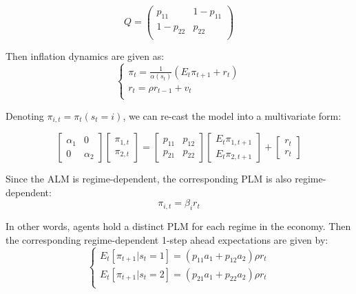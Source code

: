 \documentclass[12pt,reqno]{article}
\numberwithin{equation}{section}
\begin{document}
$$
Q=\begin{pmatrix}
p_{11} & 1-p_{11} \\
1-p_{22} & p_{22} \\
\end{pmatrix}
$$

Then inflation dynamics are given as: \\

$$
\begin{cases}
\pi_t = \frac{1}{\alpha(s_t)}(E_t \pi_{t+1} + r_t) \\
r_t = \rho r_{t-1} + v_t \\
\end{cases}
$$

Denoting $\pi_{i,t} = \pi_t (s_t=i)$, we can re-cast the model into a multivariate form:

$$
\begin{bmatrix} \alpha_1 & 0 \\ 0 & \alpha_2 \end{bmatrix} \begin{bmatrix} \pi_{1,t}  \\ \pi_{2,t}  \end{bmatrix} = \begin{bmatrix} p_{11} & p_{12} \\ p_{21} & p_{22} \end{bmatrix} \begin{bmatrix} E_t \pi_{1,t+1} \\ E_t \pi_{2,t+1} \end{bmatrix} + \begin{bmatrix}r_t \\ r_t \end{bmatrix}
$$

Since the ALM is regime-dependent, the corresponding PLM is also regime-dependent: \\


$$
\pi_{i,t} = \beta_i r_t 
$$

In other words, agents hold a distinct PLM for each regime in the economy. Then the corresponding  regime-dependent 1-step ahead expectations are  given by: \\


$$
\begin{cases}
E_t [\pi_{t+1} | s_t = 1] = (p_{11} a_1 + p_{12} a_2 ) \rho r_t \\
E_t [\pi_{t+1} | s_t = 2] = (p_{21} a_1 + p_{22} a_2 ) \rho r_t \\
\end{cases}
$$
\end{document}
